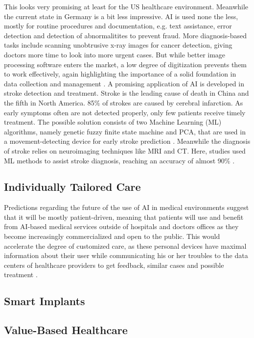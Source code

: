 This looks very promising at least for the US healthcare environment. Meanwhile the current state in Germany is a bit less impressive. AI is used none the less, mostly for routine procedures and documentation, e.g. text assistance, error detection and detection of abnormalitites to prevent fraud. More diagnosis-based tasks include scanning unobtrusive x-ray images for cancer detection, giving doctors more time to look into more urgent cases. But while better image processing software enters the market, a low degree of digitization prevents them to work effectively, again highlighting the importance of a solid foundation in data collection and management \cite{kiKroenung}. A promising application of AI is developed in stroke detection and treatment. Stroke is the leading cause of death in China and the fifth in North America. 85\% of strokes are caused by cerebral infarction. As early symptoms often are not detected properly, only few patients receive timely treatment. The possible solution consists of two Machine Learning (ML) algorithms, namely genetic fuzzy finite state machine and PCA, that are used in a movement-detecting device for early stroke prediction \cite{villar2015improving}. Meanwhile the diagnosis of stroke relies on neuroimaging techniques like MRI and CT. Here, studies used ML methods to assist stroke diagnosis, reaching an accuracy of almost 90\% \cite{rehme2014identifying}.
\subsection{Individually Tailored Care}
Predictions regarding the future of the use of AI in medical environments suggest that it will be mostly patient-driven, meaning that patients will use and benefit from AI-based medical services outside of hospitals and doctors offices as they become increasingly commercialized and open to the public. This would accelerate the degree of customized care, as these personal devices have maximal information about their user while communicating his or her troubles to the data centers of healthcare providers to get feedback, similar cases and possible treatment \cite{kiKroenung}.
\subsection{Smart Implants}
\subsection{Value-Based Healthcare}

